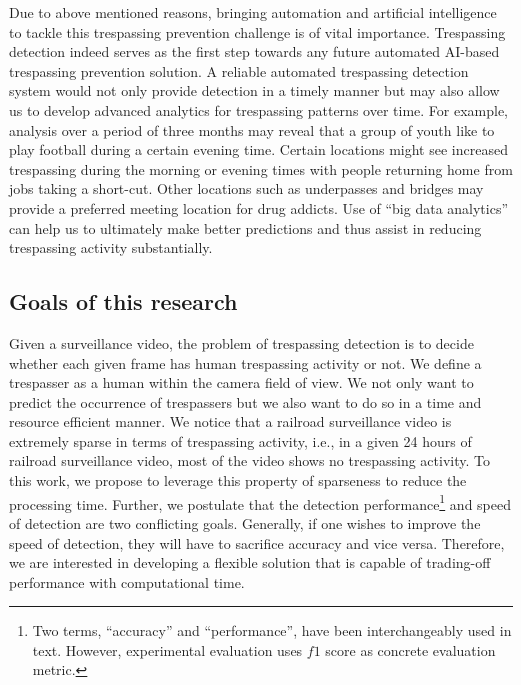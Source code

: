Due to above mentioned reasons, bringing automation and artificial intelligence to tackle this trespassing prevention challenge is of vital importance. Trespassing detection indeed serves as the first step towards any future automated AI-based trespassing prevention solution. A reliable automated trespassing detection system would not only provide detection in a timely manner but may also allow us to develop advanced analytics for trespassing patterns over time. For example, analysis over a period of three months may reveal that a group of youth like to play football during a certain evening time. Certain locations might see increased trespassing during the morning or evening times with people returning home from jobs taking a short-cut. Other locations such as underpasses and bridges may provide a preferred meeting location for drug addicts. Use of ``big data analytics'' can help us to ultimately make better predictions and thus assist in reducing trespassing activity substantially.
\subsection{Goals of this research}
\label{sec:goal}
Given a surveillance video, the problem of trespassing detection is to decide whether each given frame has human trespassing activity or not. We define a trespasser as a human within the camera field of view. We not only want to predict the occurrence of trespassers but we also want to do so in a time and resource efficient manner. We notice that a railroad surveillance video is extremely sparse in terms of trespassing activity, i.e., in a given 24 hours of railroad surveillance video, most of the video shows no trespassing activity. To this work, we propose to leverage this property of sparseness to reduce the processing time. 
Further, we postulate that the detection performance\footnote{Two terms, ``accuracy'' and ``performance'', have been interchangeably used in text. However, experimental evaluation uses $f1$ score as concrete evaluation metric.} and speed of detection are two conflicting goals. Generally, if one wishes to improve the speed of detection, they will have to sacrifice accuracy and vice versa. Therefore, we are interested in developing a  flexible solution that is capable of trading-off performance with computational time.

